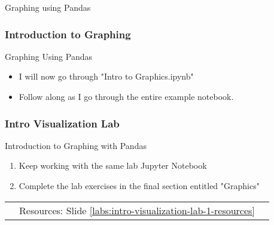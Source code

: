 \documentclass[handout, 11pt]{beamer}
\begin{document}
\begin{section}[Graphs]{Graphing using Pandas}
\begin{frame}
\begin{adjustbox}{width=0.425\textwidth, height=0.8\textheight, keepaspectratio}
\end{adjustbox}
\end{frame}
\begin{frame}
\frametitle{Introduction to Graphing}
{
\begin{block}{Graphing Using Pandas}
\begin{itemize}
\item I will now go through "Intro to Graphics.ipynb"
\item Follow along as I go through the entire example notebook.
\end{itemize}
\end{block}
}
\end{frame}
\begin{frame}
\frametitle{Intro Visualization Lab}
{
\begin{block}{Introduction to Graphing with Pandas}
\begin{enumerate}
\item Keep working with the same lab Jupyter Notebook
\item Complete the lab exercises in the final section entitled "Graphics"
\end{enumerate}
\vfill
\begin{tabular*}{\textwidth}{@{\extracolsep{\fill}}ccc}
\toprule
\hfill & Resources: Slide \textcolor{blue}{\underline{\ref{labs:intro-visualization-lab-1-resources}}} & \hfill\\

\end{tabular*}
\end{block}
}
\label{labs:intro-visualization-lab-1}
\end{frame}
\end{section}
\appendix
{}
\setcounter{finalframe}{\value{framenumber}}
\end{document}
